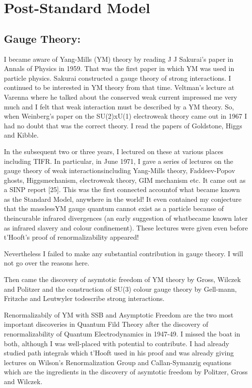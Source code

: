 \vspace{-\topsep}
\section*{Post-Standard Model}

\subsection*{Gauge Theory: }

I became aware of Yang-Mills (YM) theory by reading J J Sakurai's paper 
in Annals of Physics in 1959. That was the first paper in which YM was 
used in particle physics. Sakurai constructed a gauge theory of strong 
interactions. I continued to be intere\-sted in YM theory from that time. 
Veltman's lecture at Varenna where he talked about the conserved weak 
current impressed me very much and I felt that weak interaction must be 
described by a YM theory. So, when Weinberg's paper on the SU(2)xU(1)\break 
electroweak theory came out in 1967 I had no doubt that was the correct 
theory. I read the papers of Goldstone, Higgs and Kibble.

In the subsequent two or three years, I lectured on these at various 
places including TIFR. In particular, in June 1971, I gave a series of 
lectures on the gauge theory of weak interactions\break including Yang-Mills 
theory, Faddeev-Popov ghosts, Higgs\break mechanism, electroweak theory, GIM 
mechanism etc. It came out as a SINP report [25]. This was the first 
connected account\break of what became known as the Standard Model, anywhere 
in the world! It even contained my conjecture that the massless\break YM gauge 
quantum cannot exist as a particle because of the\break incurable infrared 
divergences (an early suggestion of what\break became known later as infrared 
slavery and colour confinement). These lectures were given even before 
t'Hooft's proof of renorma\-lizability appeared!

Nevertheless I failed to make any substantial contribution in gauge 
theory. I will not go over the reasons here.

Then came the discovery of asymtotic freedom of YM theory by Gross, 
Wilczek and Politzer and the construction of SU(3) colour gauge theory 
by Gell-mann, Fritzche and Leutwyler to\break describe strong interactions.

Renormalizabily of YM with SSB and Asymptotic Freedom are the two most 
important discoveries in Quantum Fild Theory after the discovery of 
renormalizability of Quantum Electrodynamics in 1947-49. I missed the 
boat in both, although I was well-placed with potential to contribute. I 
had already studied path integrals which t'Hooft used in his proof and 
was already giving lectures on Wilson's Renormalization Group and 
Callan-Symanzig equations which are the ingredients in the discovery of 
asymtotic freedom by Politzer, Gross and Wilczek.

